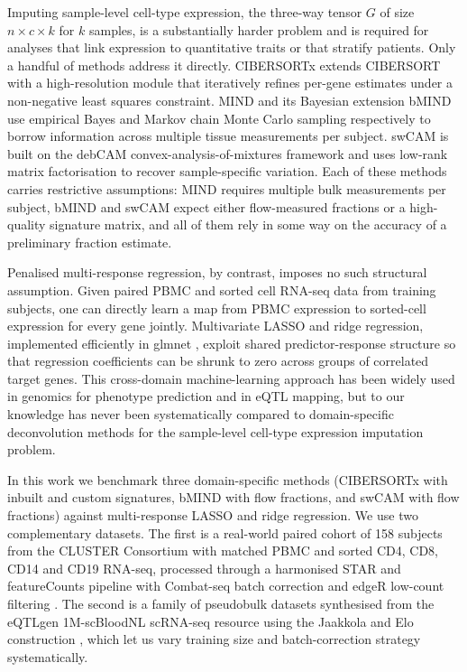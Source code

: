 Imputing sample-level cell-type expression, the three-way tensor $G$ of size $n \times c \times k$ for $k$ samples, is a substantially harder problem and is required for analyses that link expression to quantitative traits or that stratify patients. Only a handful of methods address it directly. CIBERSORTx \cite{newman2019cibersortx} extends CIBERSORT with a high-resolution module that iteratively refines per-gene estimates under a non-negative least squares constraint. MIND \cite{wang2020mind} and its Bayesian extension bMIND \cite{wang2024bmind} use empirical Bayes and Markov chain Monte Carlo sampling respectively to borrow information across multiple tissue measurements per subject. swCAM \cite{chen2022swcam} is built on the debCAM convex-analysis-of-mixtures framework \cite{chen2020debcam,wang2016undo} and uses low-rank matrix factorisation to recover sample-specific variation. Each of these methods carries restrictive assumptions: MIND requires multiple bulk measurements per subject, bMIND and swCAM expect either flow-measured fractions or a high-quality signature matrix, and all of them rely in some way on the accuracy of a preliminary fraction estimate.

Penalised multi-response regression, by contrast, imposes no such structural assumption. Given paired PBMC and sorted cell RNA-seq data from training subjects, one can directly learn a map from PBMC expression to sorted-cell expression for every gene jointly. Multivariate LASSO and ridge regression, implemented efficiently in glmnet \cite{friedman2010glmnet,tibshirani1996lasso}, exploit shared predictor-response structure so that regression coefficients can be shrunk to zero across groups of correlated target genes. This cross-domain machine-learning approach has been widely used in genomics for phenotype prediction and in eQTL mapping, but to our knowledge has never been systematically compared to domain-specific deconvolution methods for the sample-level cell-type expression imputation problem.

In this work we benchmark three domain-specific methods (CIBERSORTx with inbuilt and custom signatures, bMIND with flow fractions, and swCAM with flow fractions) against multi-response LASSO and ridge regression. We use two complementary datasets. The first is a real-world paired cohort of 158 subjects from the CLUSTER Consortium with matched PBMC and sorted CD4, CD8, CD14 and CD19 RNA-seq, processed through a harmonised STAR \cite{dobin2013star} and featureCounts \cite{liao2014featurecounts} pipeline with Combat-seq batch correction \cite{zhang2020combatseq} and edgeR low-count filtering \cite{robinson2010edger}. The second is a family of pseudobulk datasets synthesised from the eQTLgen 1M-scBloodNL scRNA-seq resource \cite{oelen2022singlecell} using the Jaakkola and Elo construction \cite{jaakkola2017comparison}, which let us vary training size and batch-correction strategy systematically.


